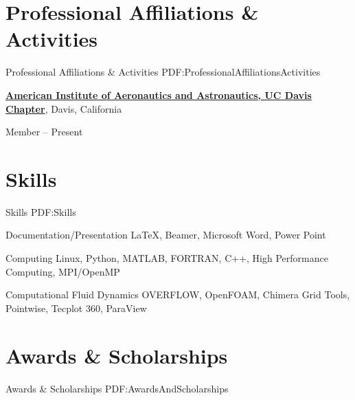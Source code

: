 \documentclass[letterpaper,MMMyyyy,nonstop]{simpleresumecv}
\begin{document}
\begin{body}

\section
{Professional Affiliations\newline
\& Activities}
{Professional Affiliations \& Activities}
{PDF:ProfessionalAffiliationsActivities}

\href{http://www.example.com/my-society}
{\textbf{American Institute of Aeronautics and Astronautics, UC Davis Chapter}},
Davis, California

\GapNoBreak
\BulletItem
Member
\hfill
{} --
Present




\section
{Skills}
{Skills}
{PDF:Skills}

Documentation/Presentation
\BulletItem
{\LaTeX},
Beamer,
Microsoft Word, Power Point

\GapNoBreak
Computing
\BulletItem
Linux,
Python,
MATLAB,
FORTRAN,
C++,
High Performance Computing,
MPI/OpenMP

\GapNoBreak
Computational Fluid Dynamics
\BulletItem
OVERFLOW,
OpenFOAM,
Chimera Grid Tools,
Pointwise,
Tecplot 360,
ParaView



\vspace{0.9in} %


\section
{Awards \&\newline
Scholarships}
{Awards \& Scholarships}
{PDF:AwardsAndScholarships}


\end{body}
\end{document}
